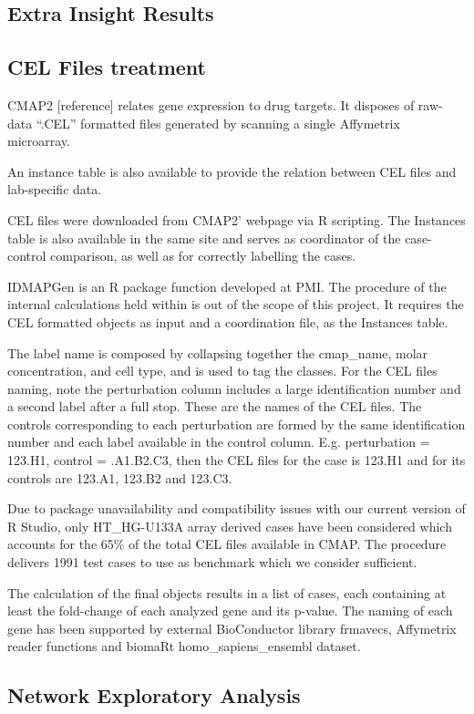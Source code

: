 \subsection{Extra Insight Results}

\subsection{CEL Files treatment}
CMAP2 [reference] relates gene expression to drug targets. It disposes of raw-data “.CEL” formatted files generated by scanning a single Affymetrix microarray.

An instance table is also available to provide the relation between CEL files and lab-specific data.

CEL files were downloaded from CMAP2’ webpage via R scripting. The Instances table is also available in the same site and serves as coordinator of the case-control comparison, as well as for correctly labelling the cases.

IDMAPGen is an R package function developed at PMI. The procedure of the internal calculations held within is out of the scope of this project. It requires the CEL formatted objects as input and a coordination file, as the Instances table.

The label name is composed by collapsing together the cmap\_name, molar concentration, and cell type, and is used to tag the classes. For the CEL files naming, note the perturbation column includes a large identification number and a second label after a full stop. These are the names of the CEL files. The controls corresponding to each perturbation are formed by the same identification number and each label available in the control column. E.g. perturbation = 123.H1, control = .A1.B2.C3, then the CEL files for the case is 123.H1 and for its controls are 123.A1, 123.B2 and 123.C3. 

Due to package unavailability and compatibility issues with our current version of R Studio, only HT\_HG-U133A array derived cases have been considered which accounts for the 65\% of the total CEL files available in CMAP. The procedure delivers 1991 test cases to use as benchmark which we consider sufficient.

The calculation of the final objects results in a list of cases, each containing at least the fold-change of each analyzed gene and its p-value. The naming of each gene has been supported by external BioConductor library frmavecs, Affymetrix reader functions and biomaRt homo\_sapiens\_ensembl dataset.

\subsection{Network Exploratory Analysis}

